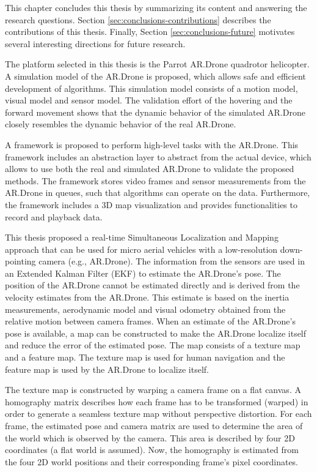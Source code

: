 This chapter concludes this thesis by summarizing its content and answering the research questions.
Section \ref{sec:conclusions-contributions} describes the contributions of this thesis.
Finally, Section \ref{sec:conclusions-future} motivates several interesting directions for future research.

The platform selected in this thesis is the Parrot AR.Drone quadrotor helicopter.
A simulation model of the AR.Drone is proposed, which allows safe and efficient development of algorithms.
This simulation model consists of a motion model, visual model and sensor model.
The validation effort of the hovering and the forward movement shows that the dynamic behavior of the simulated AR.Drone closely resembles the dynamic behavior of the real AR.Drone.

A framework is proposed to perform high-level tasks with the AR.Drone.
This framework includes an abstraction layer to abstract from the actual device, which allows to use both the real and simulated AR.Drone to validate the proposed methods.
The framework stores video frames and sensor measurements from the AR.Drone in queues, such that algorithms can operate on the data.
Furthermore, the framework includes a 3D map visualization and provides functionalities to record and playback data.

This thesis proposed a real-time Simultaneous Localization and Mapping approach that can be used for micro aerial vehicles with a low-resolution down-pointing camera (e.g., AR.Drone).
The information from the sensors are used in an Extended Kalman Filter (EKF) to estimate the AR.Drone's pose.
The position of the AR.Drone cannot be estimated directly and is derived from the velocity estimates from the AR.Drone.
This estimate is based on the inertia measurements, aerodynamic model and visual odometry obtained from the relative motion between camera frames.
When an estimate of the AR.Drone's pose is available, a map can be constructed to make the AR.Drone localize itself and reduce the error of the estimated pose.
The map consists of a texture map and a feature map.
The texture map is used for human navigation and the feature map is used by the AR.Drone to localize itself.

The texture map is constructed by warping a camera frame on a flat canvas.
A homography matrix describes how each frame has to be transformed (warped) in order to generate a seamless texture map without perspective distortion.
For each frame, the estimated pose and camera matrix are used to determine the area of the world which is observed by the camera.
This area is described by four 2D coordinates (a flat world is assumed).
Now, the homography is estimated from the four 2D world positions and their corresponding frame's pixel coordinates.

